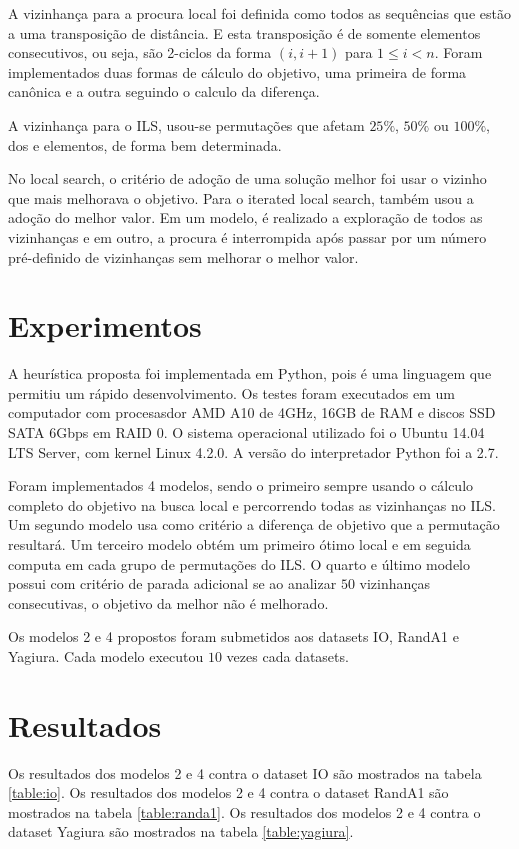 \documentclass[a4paper,10pt,onecolumn]{article}
\begin{document}
A vizinhança para a procura local foi definida como todos as sequências que
estão a uma transposição de distância. E esta transposição é de somente
elementos consecutivos, ou seja, são 2-ciclos da forma $(i,i+1)$ para $1\leq
i<n$.  Foram implementados duas formas de cálculo do objetivo, uma primeira de
forma canônica e a outra seguindo o calculo da diferença\cite{tommaso}.

A vizinhança para o ILS, usou-se permutações que afetam $25\%$, $50\%$ ou
$100\%$, dos e elementos, de forma bem determinada. 

No local search, o critério de adoção de uma solução melhor foi usar o vizinho
que mais melhorava o objetivo.  Para o iterated local search, também usou a
adoção do melhor valor. Em um modelo, é realizado a exploração de todos as
vizinhanças e em outro, a procura é interrompida após passar por um número
pré-definido de vizinhanças sem melhorar o melhor valor.

\section{Experimentos}

A heurística proposta foi implementada em Python, pois é uma
linguagem que permitiu um rápido desenvolvimento.  Os testes foram executados
em um computador com procesasdor AMD A10 de 4GHz, 16GB de RAM e discos SSD
SATA 6Gbps em RAID 0.  O sistema operacional utilizado foi o Ubuntu 14.04 LTS
Server, com kernel Linux 4.2.0.  A versão do interpretador Python foi a 2.7.

Foram implementados 4 modelos, sendo o primeiro sempre usando o cálculo
completo do
objetivo na busca local e percorrendo todas as vizinhanças no ILS. Um segundo
modelo usa como critério a diferença de objetivo que a permutação resultará.
Um terceiro modelo obtém um primeiro ótimo local e em seguida computa em cada
grupo de permutações do ILS.  O quarto e último modelo possui com critério de
parada adicional se ao analizar $50$ vizinhanças consecutivas, o objetivo da
melhor não é melhorado.

Os modelos 2 e 4 propostos foram submetidos aos datasets IO\cite{ds_io},
RandA1\cite{ds_randa1} e Yagiura\cite{ds_yagiura}.  Cada modelo executou $10$
vezes cada datasets.

\section{Resultados}

Os resultados dos modelos 2 e 4 contra o dataset IO são mostrados na tabela
\ref{table:io}.
Os resultados dos modelos 2 e 4 contra o dataset RandA1 são mostrados na tabela
\ref{table:randa1}.
Os resultados dos modelos 2 e 4 contra o dataset Yagiura são mostrados na tabela
\ref{table:yagiura}.
\end{document}
